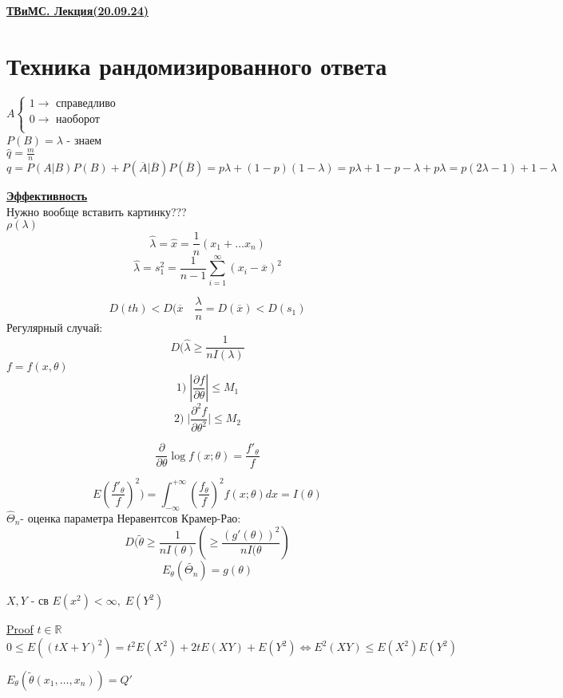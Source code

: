 \documentclass[a4paper]{article}
\begin{document}
\begin{center}
    \textbf{\underline{ТВиМС. Лекция(20.09.24)}}
\end{center}

\section*{\centering Техника рандомизированного ответа}
$ A \begin{cases}
    1 \to \text{ справедливо} \\
    0 \to \text{ наоборот }\\
\end{cases} $  \\
$ P(B) = \lambda $ - знаем \\
$ \hat{q} = \frac{m}{n}$
\[
    q = P(A|B)P(B) + P(\overline{A} | \overline{B})
P(\overline{B}) = p\lambda + (1-p)(1-\lambda) = p\lambda + 1 - p - \lambda + p\lambda 
= p(2\lambda - 1) + 1 - \lambda
\]

\textbf{\underline{Эффективность}} \\
Нужно вообще вставить картинку??? \\

$ \rho(\lambda) $ 
\[
    \hat{\lambda} = \hat{x} = \frac{1}{n}(x_1 + \dots x_n)
\]
\[
    \hat{\lambda} = s_1^2 = \frac{1}{n-1} \sum\limits_{i=1}^{\infty} 
    (x_i - \overline{x})^2
\]

\[
    D(th) < D(\overline{x} \quad \frac{\lambda}{n} = D(\overline{x}) < D(s_1)
\]
Регулярный случай:
\[
    D(\hat{\lambda} \geq \frac{1}{nI(\lambda)}  
\]
$ f=f(x, \theta) $ 
\[
    1) \; | \frac{\partial f}{\partial \theta}| \leq M_1
\]
\[
2)\; \big | \frac{\partial ^2 f}{\partial \theta^2} \big | \leq M_2
\]

\[
    \frac{\partial }{\partial \theta} \log f(x;\theta) = \frac{f'_\theta}{f}  
\]

\[
    E(\frac{f'_\theta}{f})^2) = \int_{-\infty}^{+\infty}(\frac{f_\theta}{f})^2
    f(x;\theta)dx = I(\theta)
\]
$ \hat{\Theta}_n $- оценка параметра
Неравентсов Крамер-Рао:
\[
D(\tilde{\theta} \geq \frac{1}{nI(\theta)} ( \geq \frac{(g'(\theta))^2}{nI(\theta} ) 
\]
\[
    E_\theta(\tilde{\Theta_n}) = g(\theta)
\]

$ X, Y $ - св $ E(x^2) < \infty, \; E(Y^2) $ 

\underline{Proof} $ t \in \mathbb{R} $ \\
\[
    0 \leq E((tX+Y)^2) = t^2 E(X^2) + 2tE(XY) + E(Y^2) \iff E^2(XY) \leq E(X^2)E(Y^2)
\]

$ E_\theta(\tilde{\theta}(x_1, \dots, x_n)) = Q' $
\end{document}
